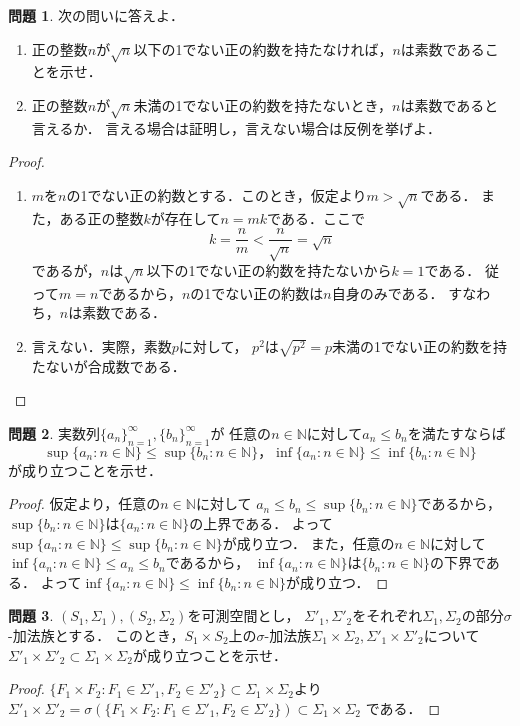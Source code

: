 \documentclass{jsarticle}
\theoremstyle{definition}
\newtheorem{qst}{問題}
\begin{document}
\begin{qst}
次の問いに答えよ．
\begin{enumerate}
\item 正の整数$n$が$\sqrt{n}$以下の1でない正の約数を持たなければ，$n$は素数であることを示せ．
\item 正の整数$n$が$\sqrt{n}$未満の1でない正の約数を持たないとき，$n$は素数であると言えるか．
言える場合は証明し，言えない場合は反例を挙げよ．
\end{enumerate}
\end{qst}
\begin{proof}
\begin{enumerate}
\item $m$を$n$の1でない正の約数とする．このとき，仮定より$m>\sqrt{n}$である．
また，ある正の整数$k$が存在して$n=mk$である．ここで
\[ k=\frac{n}{m}<\frac{n}{\sqrt{n}}=\sqrt{n} \]
であるが，$n$は$\sqrt{n}$以下の1でない正の約数を持たないから$k=1$である．
従って$m=n$であるから，$n$の1でない正の約数は$n$自身のみである．
すなわち，$n$は素数である．
\item 言えない．実際，素数$p$に対して，
$p^2$は$\sqrt{p^2}=p$未満の1でない正の約数を持たないが合成数である．
\end{enumerate}
\end{proof}

\begin{qst}
実数列$\{a_n\}_{n=1}^\infty,\{b_n\}_{n=1}^\infty$が
任意の$n\in\mathbb{N}$に対して$a_n\leq b_n$を満たすならば
\[
\sup\{a_n:n\in\mathbb{N}\}\leq\sup\{b_n:n\in\mathbb{N}\}，
\inf\{a_n:n\in\mathbb{N}\}\leq\inf\{b_n:n\in\mathbb{N}\}
\]
が成り立つことを示せ．
\end{qst}
\begin{proof}
仮定より，任意の$n\in\mathbb{N}$に対して
$a_n\leq b_n\leq\sup\{b_n:n\in\mathbb{N}\}$であるから，
$\sup\{b_n:n\in\mathbb{N}\}$は$\{a_n:n\in\mathbb{N}\}$の上界である．
よって$\sup\{a_n:n\in\mathbb{N}\}\leq\sup\{b_n:n\in\mathbb{N}\}$が成り立つ．
また，任意の$n\in\mathbb{N}$に対して
$\inf\{a_n:n\in\mathbb{N}\}\leq a_n\leq b_n$であるから，
$\inf\{a_n:n\in\mathbb{N}\}$は$\{b_n:n\in\mathbb{N}\}$の下界である．
よって$\inf\{a_n:n\in\mathbb{N}\}\leq\inf\{b_n:n\in\mathbb{N}\}$が成り立つ．
\end{proof}

\begin{qst}
$(S_1,\Sigma_1),(S_2,\Sigma_2)$を可測空間とし，
$\Sigma'_1,\Sigma'_2$をそれぞれ$\Sigma_1,\Sigma_2$の部分$\sigma$-加法族とする．
このとき，$S_1\times S_2$上の$\sigma$-加法族$\Sigma_1\times\Sigma_2,
\Sigma'_1\times\Sigma'_2$について
$\Sigma'_1\times\Sigma'_2\subset\Sigma_1\times\Sigma_2$が成り立つことを示せ．
\end{qst}
\begin{proof}
$\{F_1\times F_2:F_1\in\Sigma'_1,F_2\in\Sigma'_2\}\subset\Sigma_1\times\Sigma_2$より
$\Sigma'_1\times\Sigma'_2
=\sigma(\{F_1\times F_2:F_1\in\Sigma'_1,F_2\in\Sigma'_2\})\subset\Sigma_1\times\Sigma_2$
である．
\end{proof}
\end{document}
